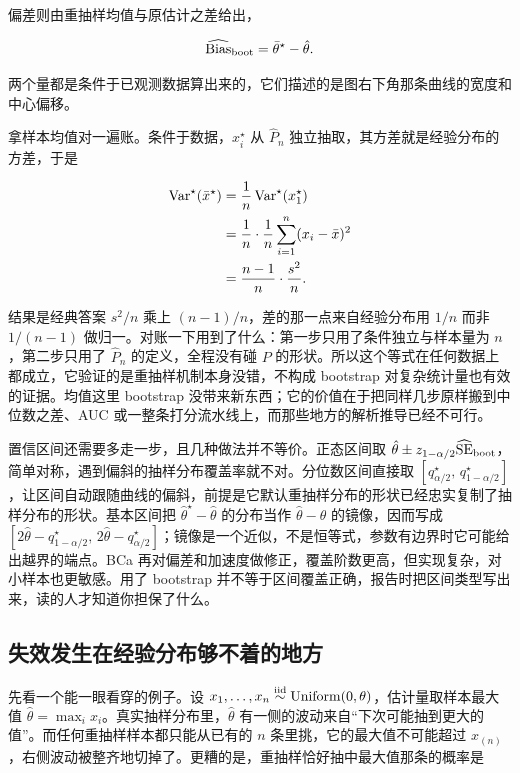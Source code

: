 偏差则由重抽样均值与原估计之差给出，

\[
\widehat{\operatorname{Bias}}_{\mathrm{boot}}=\bar\theta^\star-\hat\theta.
\]

两个量都是条件于已观测数据算出来的，它们描述的是图右下角那条曲线的宽度和中心偏移。

拿样本均值对一遍账。条件于数据，\(x_i^\star\) 从 \(\hat P_n\) 独立抽取，其方差就是经验分布的方差，于是

\[
\begin{aligned}
\operatorname{Var}^\star(\bar x^\star)
&=\frac1n\operatorname{Var}^\star(x_1^\star)\\
&=\frac1n\cdot\frac1n\sum_{i=1}^n(x_i-\bar x)^2\\
&=\frac{n-1}{n}\cdot\frac{s^2}{n}.
\end{aligned}
\]

结果是经典答案 \(s^2/n\) 乘上 \((n-1)/n\)，差的那一点来自经验分布用 \(1/n\) 而非 \(1/(n-1)\) 做归一。对账一下用到了什么：第一步只用了条件独立与样本量为 \(n\)，第二步只用了 \(\hat P_n\) 的定义，全程没有碰 \(P\) 的形状。所以这个等式在任何数据上都成立，它验证的是重抽样机制本身没错，不构成 bootstrap 对复杂统计量也有效的证据。均值这里 bootstrap 没带来新东西；它的价值在于把同样几步原样搬到中位数之差、AUC 或一整条打分流水线上，而那些地方的解析推导已经不可行。

置信区间还需要多走一步，且几种做法并不等价。正态区间取 \(\hat\theta\pm z_{1-\alpha/2}\widehat{\operatorname{SE}}_{\mathrm{boot}}\)，简单对称，遇到偏斜的抽样分布覆盖率就不对。分位数区间直接取 \([q^\star_{\alpha/2},\,q^\star_{1-\alpha/2}]\)，让区间自动跟随曲线的偏斜，前提是它默认重抽样分布的形状已经忠实复制了抽样分布的形状。基本区间把 \(\hat\theta^\star-\hat\theta\) 的分布当作 \(\hat\theta-\theta\) 的镜像，因而写成 \([2\hat\theta-q^\star_{1-\alpha/2},\,2\hat\theta-q^\star_{\alpha/2}]\)；镜像是一个近似，不是恒等式，参数有边界时它可能给出越界的端点。BCa 再对偏差和加速度做修正，覆盖阶数更高，但实现复杂，对小样本也更敏感。用了 bootstrap 并不等于区间覆盖正确，报告时把区间类型写出来，读的人才知道你担保了什么。

\subsection{失效发生在经验分布够不着的地方}

先看一个能一眼看穿的例子。设 \(x_1,\ldots,x_n\overset{\mathrm{iid}}{\sim}\operatorname{Uniform}(0,\theta)\)，估计量取样本最大值 \(\hat\theta=\max_i x_i\)。真实抽样分布里，\(\hat\theta\) 有一侧的波动来自``下次可能抽到更大的值''。而任何重抽样样本都只能从已有的 \(n\) 条里挑，它的最大值不可能超过 \(x_{(n)}\)，右侧波动被整齐地切掉了。更糟的是，重抽样恰好抽中最大值那条的概率是

